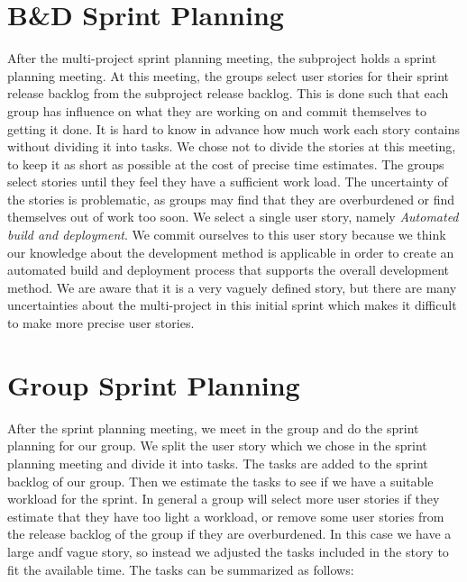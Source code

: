\section{B\&D Sprint Planning}
After the multi-project sprint planning meeting, the \bd subproject holds a sprint planning meeting. At this meeting, the \bd groups select user stories for their sprint release backlog from the \bd subproject release backlog. This is done such that each group has influence on what they are working on and commit themselves to getting it done. It is hard to know in advance how much work each story contains without dividing it into tasks. We chose not to divide the stories at this meeting, to keep it as short as possible at the cost of precise time estimates. The groups select stories until they feel they have a sufficient work load. The uncertainty of the stories is problematic, as groups may find that they are overburdened or find themselves out of work too soon. We select a single user story, namely \emph{Automated build and deployment}. We commit ourselves to this user story because we think our knowledge about the development method is applicable in order to create an automated build and deployment process that supports the overall development method. We are aware that it is a very vaguely defined story, but there are many uncertainties about the multi-project in this initial sprint which makes it difficult to make more precise user stories.

\section{Group Sprint Planning}\label{sec:group_sprint_planning}
After the \bd sprint planning meeting, we meet in the group and do the sprint planning for our group. We split the user story which we chose in the \bd sprint planning meeting and divide it into tasks. The tasks are added to the sprint backlog of our group. Then we estimate the tasks to see if we have a suitable workload for the sprint. In general a group will select more user stories if they estimate that they have too light a workload, or remove some user stories from the release backlog of the group if they are overburdened. In this case we have a large andf vague story, so instead we adjusted the tasks included in the story to fit the available time. The tasks can be summarized as follows: 

